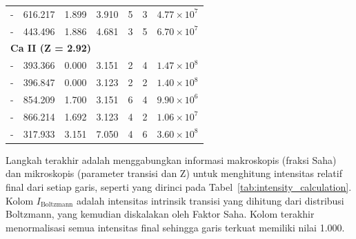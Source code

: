 \begin{table}[H]
\begin{tabular}{lcccccc}
        \quad - & 616.217 & 1.899 & 3.910 & 5 & 3 & $4.77 \times 10^7$ \\
        \quad - & 443.496 & 1.886 & 4.681 & 3 & 5 & $6.70 \times 10^7$ \\
        \midrule
        \multicolumn{7}{l}{\textbf{Ca II (Z = 2.92)}} \\
        \quad - & 393.366 & 0.000 & 3.151 & 2 & 4 & $1.47 \times 10^8$ \\
        \quad - & 396.847 & 0.000 & 3.123 & 2 & 2 & $1.40 \times 10^8$ \\
        \quad - & 854.209 & 1.700 & 3.151 & 6 & 4 & $9.90 \times 10^6$ \\
        \quad - & 866.214 & 1.692 & 3.123 & 4 & 2 & $1.06 \times 10^7$ \\
        \quad - & 317.933 & 3.151 & 7.050 & 4 & 6 & $3.60 \times 10^8$ \\
        \bottomrule
    \end{tabular}
\end{table}

Langkah terakhir adalah menggabungkan informasi makroskopis (fraksi Saha) dan mikroskopis (parameter transisi dan Z) untuk menghitung intensitas relatif final dari setiap garis, seperti yang dirinci pada Tabel~\ref{tab:intensity_calculation}. Kolom $I_{\text{Boltzmann}}$ adalah intensitas intrinsik transisi yang dihitung dari distribusi Boltzmann, yang kemudian diskalakan oleh Faktor Saha. Kolom terakhir menormalisasi semua intensitas final sehingga garis terkuat memiliki nilai 1.000.

